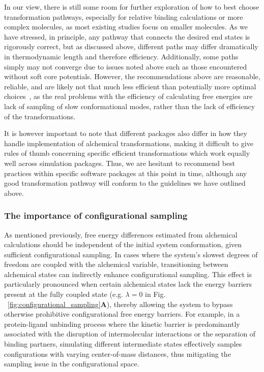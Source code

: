 \documentclass[9pt,bestpractices]{livecoms}
\begin{document}
In our view, there is still some room for further exploration of how to best choose transformation pathways, especially for relative binding calculations or more complex molecules, as most existing studies focus on smaller molecules. As we have stressed, in principle, any pathway that connects the desired end states is rigorously correct, but as discussed above, different paths may differ dramatically in thermodynamic length and therefore efficiency. Additionally, some paths simply may not converge due to issues noted above such as those encountered without soft core potentials. However, the recommendations above are reasonable, reliable, and are likely not that much less efficient than potentially more optimal choices~\cite{naden2014linear,naden2015linear,pham2012optimal}, as the real problems with the efficiency of calculating free energies are lack of sampling of slow conformational modes, rather than the lack of efficiency of the transformations. 

It is however important to note that different packages also differ in how they handle implementation of alchemical transformations, making it difficult to give rules of thumb concerning specific efficient transformations which work equally well across simulation packages. Thus, we are hesitant to recommend best practices within specific software packages at this point in time, although any good transformation pathway will conform to the guidelines we have outlined above.

\subsubsection{The importance of configurational sampling}
\label{sec:configurational_sampling}
As mentioned previously, free energy differences estimated from alchemical calculations should be independent of the initial system conformation, given sufficient configurational sampling. In cases where the system's slowest degrees of freedom are coupled with the alchemical variable, transitioning between alchemical states can indirectly enhance configurational sampling. This effect is particularly pronounced when certain alchemical states lack the energy barriers present at the fully coupled state (e.g. $\lambda=0$ in Fig. ~\ref{fig:configurational_sampling}\textbf{A}), thereby allowing the system to bypass otherwise prohibitive configurational free energy barriers. For example, in a protein-ligand unbinding process where the kinetic barrier is predominantly associated with the disruption of intermolecular interactions or the separation of binding partners, simulating different intermediate states effectively samples configurations with varying center-of-mass distances, thus mitigating the sampling issue in the configurational space. 
\end{document}
